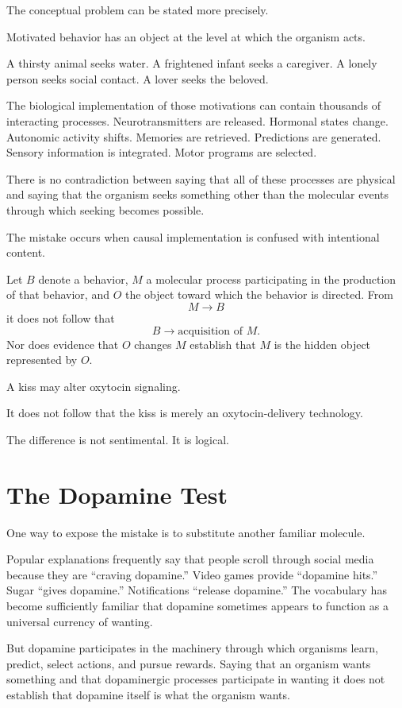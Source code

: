 \documentclass[12pt]{article}
\begin{document}
The conceptual problem can be stated more precisely.

Motivated behavior has an object at the level at which the organism acts.

A thirsty animal seeks water. A frightened infant seeks a caregiver. A lonely person seeks social contact. A lover seeks the beloved.

The biological implementation of those motivations can contain thousands of interacting processes. Neurotransmitters are released. Hormonal states change. Autonomic activity shifts. Memories are retrieved. Predictions are generated. Sensory information is integrated. Motor programs are selected.

There is no contradiction between saying that all of these processes are physical and saying that the organism seeks something other than the molecular events through which seeking becomes possible.

The mistake occurs when causal implementation is confused with intentional content.

Let $B$ denote a behavior, $M$ a molecular process participating in the production of that behavior, and $O$ the object toward which the behavior is directed. From
\[
M \rightarrow B
\]
it does not follow that
\[
B \rightarrow \text{acquisition of } M.
\]
Nor does evidence that $O$ changes $M$ establish that $M$ is the hidden object represented by $O$.

A kiss may alter oxytocin signaling.

It does not follow that the kiss is merely an oxytocin-delivery technology.

The difference is not sentimental. It is logical.

\section{The Dopamine Test}

One way to expose the mistake is to substitute another familiar molecule.

Popular explanations frequently say that people scroll through social media because they are ``craving dopamine.'' Video games provide ``dopamine hits.'' Sugar ``gives dopamine.'' Notifications ``release dopamine.'' The vocabulary has become sufficiently familiar that dopamine sometimes appears to function as a universal currency of wanting.

But dopamine participates in the machinery through which organisms learn, predict, select actions, and pursue rewards. Saying that an organism wants something and that dopaminergic processes participate in wanting it does not establish that dopamine itself is what the organism wants.
\end{document}
